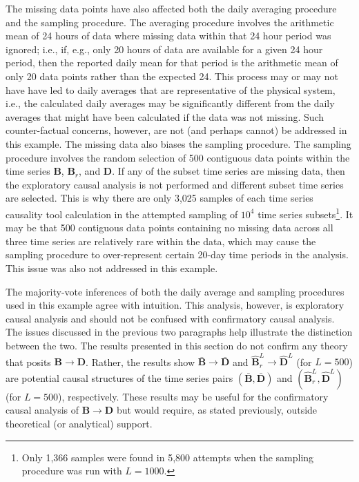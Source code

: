 The missing data points have also affected both the daily averaging procedure and the sampling procedure.  The averaging procedure involves the arithmetic mean of 24 hours of data where missing data within that 24 hour period was ignored; i.e., if, e.g., only 20 hours of data are available for a given 24 hour period, then the reported daily mean for that period is the arithmetic mean of only 20 data points rather than the expected 24.  This process may or may not have have led to daily averages that are representative of the physical system, i.e., the calculated daily averages may be significantly different from the daily averages that might have been calculated if the data was not missing.  Such counter-factual concerns, however, are not (and perhaps cannot) be addressed in this example.  The missing data also biases the sampling procedure.  The sampling procedure involves the random selection of 500 contiguous data points within the time series $\mathbf{B}$, $\mathbf{B}_r$, and $\mathbf{D}$.  If any of the subset time series are missing data, then the exploratory causal analysis is not performed and different subset time series are selected.  This is why there are only 3,025 samples of each time series causality tool calculation in the attempted sampling of $10^4$ time series subsets\footnote{Only 1,366 samples were found in 5,800 attempts when the sampling procedure was run with $L=1000$.}.  It may be that 500 contiguous data points containing no missing data across all three time series are relatively rare within the data, which may cause the sampling procedure to over-represent certain 20-day time periods in the analysis.  This issue was also not addressed in this example.  

The majority-vote inferences of both the daily average and sampling procedures used in this example agree with intuition.  This analysis, however, is exploratory causal analysis and should not be confused with confirmatory causal analysis.  The issues discussed in the previous two paragraphs help illustrate the distinction between the two.  The results presented in this section do not confirm any theory that posits $\mathbf{B}\rightarrow\mathbf{D}$.  Rather, the results show $\bar{\mathbf{B}}\rightarrow\bar{\mathbf{D}}$ and $\hat{\mathbf{B}}^L_r\rightarrow\hat{\mathbf{D}}^L$ (for $L=500$) are potential causal structures of the time series pairs $(\bar{\mathbf{B}},\bar{\mathbf{D}})$ and $(\hat{\mathbf{B}}^L_r,\hat{\mathbf{D}}^L)$ (for $L=500$), respectively.  These results may be useful for the confirmatory causal analysis of $\mathbf{B}\rightarrow\mathbf{D}$ but would require, as stated previously, outside theoretical (or analytical) support.

